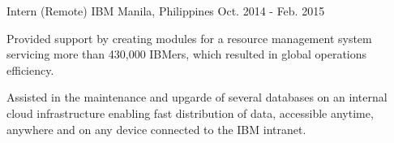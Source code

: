 \begin{cventries}
{\begin{cvitems}
        \end{cvitems}
    }
  \cventry
    {Intern (Remote)} %
    {IBM} %
    {Manila, Philippines} %
    {Oct. 2014 - Feb. 2015} %
    {} %
    {
      \begin{cvitems} %
        \item {Provided support by creating modules for a resource management system servicing more than 430,000 IBMers, which resulted in global operations efficiency.}
        \item {Assisted in the maintenance and upgarde of several databases on an internal cloud infrastructure enabling fast distribution of data, accessible anytime, anywhere and on any device connected to the IBM intranet.}
      \end{cvitems}
    }

\end{cventries}
